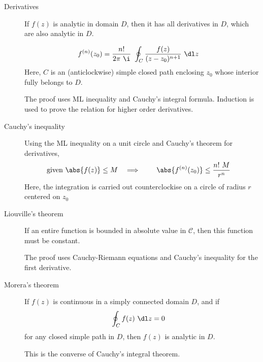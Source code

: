 \begin{description}
    \item[Derivatives] If $ f(z) $ is analytic in domain $ D $, then it has all
        derivatives in $ D $, which are also analytic in $ D $. \par
        \begin{align}
            f^{(n)}(z_0) & = \frac{n!}{2\pi\ \i}\ \oint_C \frac{f(z)}{(z - z_0)^{n+1}}
            \ \dl z
        \end{align}
        Here, $ C $ is an (anticlockwise) simple closed path enclosing $ z_0 $ whose
        interior fully belongs to $ D $. \par
        The proof uses ML inequality and Cauchy's integral formula. Induction is used
        to prove the relation for higher order derivatives.

    \item[Cauchy's inequality] Using the ML inequality on a unit circle and Cauchy's
        theorem for derivatives,
        \begin{align}
            \text{given}\ \abs{f(z)}           & \leq M                 &
            \implies \qquad \abs{f^{(n)}(z_0)} & \leq \frac{n!\ M}{r^n}
        \end{align}
        Here, the integration is carried out counterclockise on a circle of radius $ r $
        centered on $ z_0 $

    \item[Liouville's theorem] If an entire function is bounded in absolute value in
        $ \mathcal{C} $, then this function must be constant. \par
        The proof uses Cauchy-Riemann equations and Cauchy's inequality for the first
        derivative.

    \item[Morera's theorem] If $ f(z) $ is continuous in a simply connected domain $ D $,
        and if
        \begin{align}
            \oint_C f(z)\ \dl z & = 0
        \end{align}
        for any closed simple path in $ D $, then $ f(z) $ is analytic in $ D $. \par
        This is the converse of Cauchy's integral theorem.
\end{description}